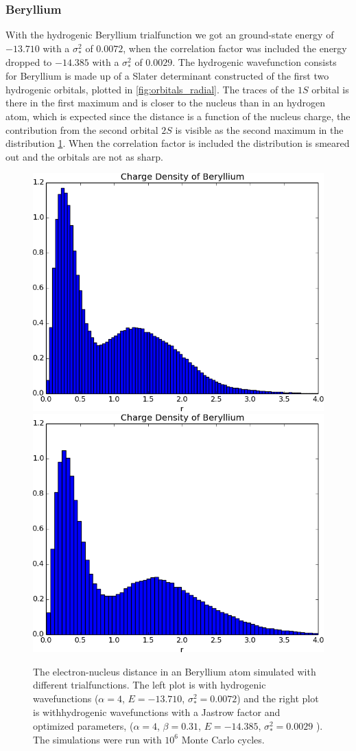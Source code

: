 	\subsubsection{Beryllium}
		With the hydrogenic Beryllium trialfunction we got an ground-state energy of \(-13.710\) with a $\sigma^2_* $ of $ 0.0072$, when the correlation factor was included the energy dropped to $-14.385$ with a $\sigma^2_* $ of $0.0029$.
		The hydrogenic wavefunction consists for Beryllium is made up of a Slater determinant constructed of the first two hydrogenic orbitals, plotted in \cref{fig:orbitals_radial}. The traces of the \(1S\) orbital is there in the first maximum and is closer to the nucleus than in an hydrogen atom, which is expected since the distance is a function of the nucleus charge, the contribution from the second orbital \(2S\) is visible as the second maximum in the distribution \cref{fig:chargeDensityBeryllium}. When the correlation factor is included the distribution is smeared out and the orbitals are not as sharp.


		\begin{figure}
			\centering \includegraphics[width=0.45\linewidth]{../figures/used/ChargeDensityBerylliumSimple}
			\centering \includegraphics[width=0.45\linewidth]{../figures/used/ChargeDensityBeryllium}
			\protect\caption{The electron-nucleus distance in an Beryllium atom simulated with different trialfunctions. The left plot is with hydrogenic wavefunctions ($\alpha = 4$, $E = -13.710$, $\sigma^2_* = 0.0072$) and the right plot is withhydrogenic wavefunctions with a Jastrow factor and optimized parameters, ($\alpha = 4$, $\beta = 0.31$,  $E = -14.385$, $\sigma^2_* = 0.0029$ ). The simulations were run with \(10^6\) Monte Carlo cycles.}
			\label{fig:chargeDensityBeryllium}
		\end{figure}

